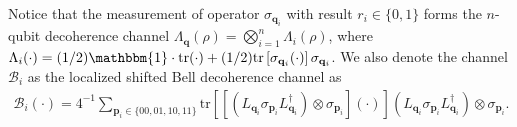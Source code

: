 \documentclass[aps,%
twocolumn,%
floatfix,%
pra,%
amsfonts,%
groupedaddress,%
superscriptaddress]{revtex4-2}%
\newcommand{\1}{\mathbbm{1}}
\begin{document}
  Notice that the measurement of operator $\sigma_{\mathbf{q}_i}$ with result ${r}_i \in \{0,1\}$ forms the $n$-qubit decoherence channel $\Lambda_{\mathbf{q}}(\rho) = \bigotimes_{i= 1}^{n} \Lambda_{i}(\rho)$, where $\Lambda_{i}(\cdot ) = (1/2)\1\cdot\mathrm{tr}(\cdot) + (1/2)\mathrm{tr}\left[\sigma_{\mathbf{q}_i} (\cdot)\right] \sigma_{\mathbf{q}_i}$. 
  We also denote the channel $\mathcal{B}_i$ as the localized shifted Bell decoherence channel as 
  \begin{align}
    \mathcal{B}_{i}(\cdot) = 4^{-1}\sum_{\mathbf{p}_i \in \{00,01,10,11\}}\mathrm{tr}\left[\left[(L_{\mathbf{q}_i}\sigma_{\mathbf{p}_i}L_{\mathbf{q}_i}^{\dagger}) \otimes \sigma_{\mathbf{p}_i}\right](\cdot) \right](L_{\mathbf{q}_i}\sigma_{\mathbf{p}_i}L_{\mathbf{q}_i}^{\dagger}) \otimes \sigma_{\mathbf{p}_i}.
\end{align}
\end{document}
